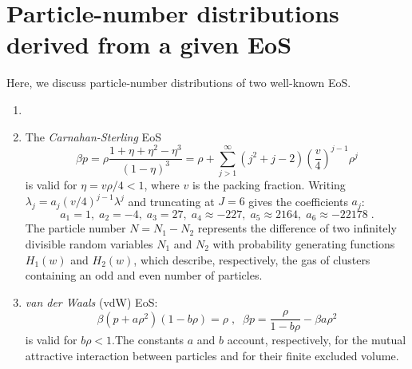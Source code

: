 \documentclass[a4paper,12pt]{amsart}
\theoremstyle{definition}
\theoremstyle{remark}
\begin{document}
\section{Particle-number distributions derived from a given EoS}\label{RecEoS}
Here, we discuss particle-number distributions of two well-known EoS.
\begin{enumerate}[label=(\roman*), leftmargin=*]
\item[]
\item The {\it Carnahan-Sterling} EoS \cite{Carnahan1969} 
\begin{equation}\label{CS_EoS}
\beta p=\rho \frac{1+\eta+\eta^2-\eta^3}{(1-\eta)^3}=\rho+\sum_{j>1}^{\infty} \left(j^2+j-2\right) \left(\frac{v}{4}\right)^{j-1}\rho^j
\end{equation}
is valid for $\eta=v\rho/4<1$, where $v$ is the packing fraction.
Writing $\lambda_j=a_j(v/4)^{j-1}\lambda^j$ and truncating at $J=6$ gives the coefficients \(a_j\):
\[ a_1=1,\; a_2=-4,\;a_3=27,\;a_4\approx -227,\;a_5
\approx 2164,\;a_6\approx -22178\;.
\]
The particle number \(N = N_1 - N_2\) represents the difference of two infinitely divisible random variables \(N_1\) and \(N_2\) with probability generating functions \(H_1(w)\) and \(H_2(w)\), which describe, respectively, the gas of clusters containing an odd and even number of particles.
\item {\it van der Waals} (vdW) EoS:
\begin{equation}\label{vdWEoS}
\beta (p+ a\rho^2)(1-b \rho)=\rho\;,\;\;
\beta p  
=\frac{\rho}{1-b\rho}-\beta a \rho^2
\end{equation}
is valid for $b\rho<1$.The constants \(a\) and \(b\) account, respectively, for the mutual attractive interaction between particles and for their finite excluded volume. 



\end{enumerate}
\end{document}
